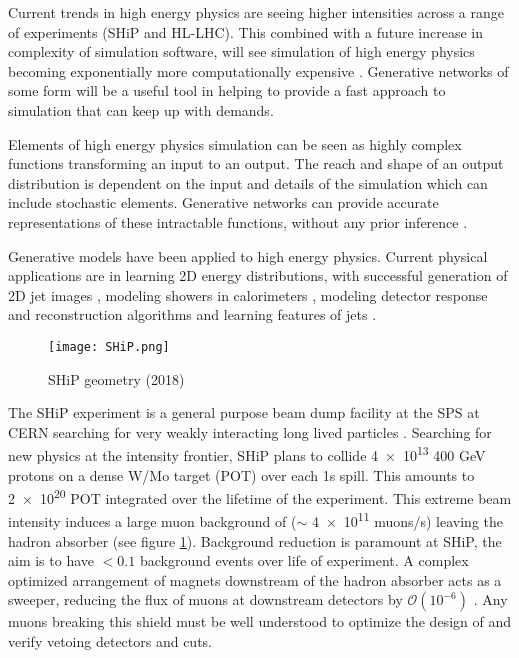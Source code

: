 \documentclass{article}
\begin{document}
    Current trends in high energy physics are seeing higher intensities across a range of experiments (SHiP and HL-LHC). This combined with a future increase in complexity of simulation software, will see simulation of high energy physics becoming exponentially more computationally expensive \cite{albrecht2018roadmap}. Generative networks of some form will be a useful tool in helping to provide a fast approach to simulation that can keep up with demands. 
    
    
    Elements of high energy physics simulation can be seen as highly complex functions transforming an input to an output. The reach and shape of an output distribution is dependent on the input and details of the simulation which can include stochastic elements. Generative networks can provide accurate representations of these intractable functions, without any prior inference \cite{mirza2014conditional}.%
    
    Generative models have been applied to high energy physics. Current physical applications are in learning 2D energy distributions, with successful generation of 2D jet images \cite{de2017learning}, modeling showers in calorimeters \cite{erdmann2018precise} \cite{paganini2018accelerating}, modeling detector response and reconstruction algorithms \cite{musella2018fast} and learning features of jets \cite{monk2018deep}. 
    
    \begin{figure}[h!]
    \centering
    \texttt{[image: SHiP.png]}
    \caption{SHiP geometry (2018)}
    \label{SHiP}
    \end{figure}
    
    The SHiP experiment is a general purpose beam dump facility at the SPS at CERN searching for very weakly interacting long lived particles \cite{ship1504technical}. Searching for new physics at the intensity frontier, SHiP plans to collide \num{4e13} 400 GeV protons on a dense W/Mo target (POT) over each 1s spill. This amounts to \num{2e20} POT integrated over the lifetime of the experiment. This extreme beam intensity induces a large muon background of ($\sim$ \num{4e11} muons/s) leaving the hadron absorber (see figure \ref{SHiP}). Background reduction is paramount at SHiP, the aim is to have $< 0.1$ background events over life of experiment. A complex optimized arrangement of magnets downstream of the hadron absorber acts as a sweeper, reducing the flux of muons at downstream detectors by $\mathcal{O}(10^{-6})$ \cite{akmete2017active}. Any muons breaking this shield must be well understood to optimize the design of and verify vetoing detectors and cuts. 
    
\end{document}
